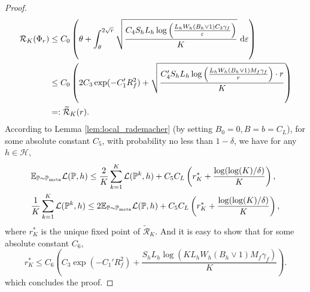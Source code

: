 \documentclass[11pt]{article}
\numberwithin{equation}{section}
\newcommand{\Pmeta}{\mathbb{P}_{\text{meta}}}
\renewcommand{\P}{\mathbb{P}}
\begin{document}
\begin{proof}
\begin{equation}
        \begin{aligned}
            \mathcal{R}_K(\Phi_r)
            &\leq C_0\left(\theta+\int_\theta^{2\sqrt{r}}\sqrt{\frac{C_4S_hL_h\log\left(\frac{L_hW_h(B_h\vee 1)C_3\gamma_f}{\varepsilon}\right)}{K}}\ \mathrm{d}\varepsilon\right) \\
            &\leq C_0\left(2C_3\exp(-C_1'R_f^2)+\sqrt{\frac{C_4'S_hL_h\log\left(\frac{L_hW_h(B_h\vee 1)M_f\gamma_f}{r}\right)\cdot r}{K}} \right) \\
            &=: \widetilde{\mathcal{R}}_K(r).
        \end{aligned}
    \end{equation}
    According to Lemma \ref{lem:local_rademacher} (by setting $B_0=0,B=b=C_L$), for some absolute constant $C_5$, with probability no less than $1-\delta$, we have for any $h\in\mathcal{H}$,
    \begin{align}
        &\E_{\P\sim\Pmeta}\mathcal{L}(\P,h)
        \leq \frac{2}{K}\sum_{k=1}^K\mathcal{L}(\P^k,h)+C_5C_L\left(r_K^*+\frac{\log(\log (K)/\delta)}{K}\right), \\
        &\frac{1}{K}\sum_{k=1}^K\mathcal{L}(\P^k,h)\leq 2\E_{\P\sim\Pmeta}\mathcal{L}(\P,h)
        +C_5C_L\left(r_K^*+\frac{\log(\log (K)/\delta)}{K}\right),
    \end{align}
    where $r_K^*$ is the unique fixed point of $\widetilde{\mathcal{R}}_K$.
    And it is easy to show that for some absolute constant $C_6$,
    \begin{equation}
        r_K^*\leq C_6\left(C_3\exp(-C_1'R_f^2)+\frac{S_hL_h\log\left(KL_hW_h(B_h\vee 1)M_f\gamma_f\right)}{K}\right).
    \end{equation}
    which concludes the proof.
\end{proof}
\end{document}
